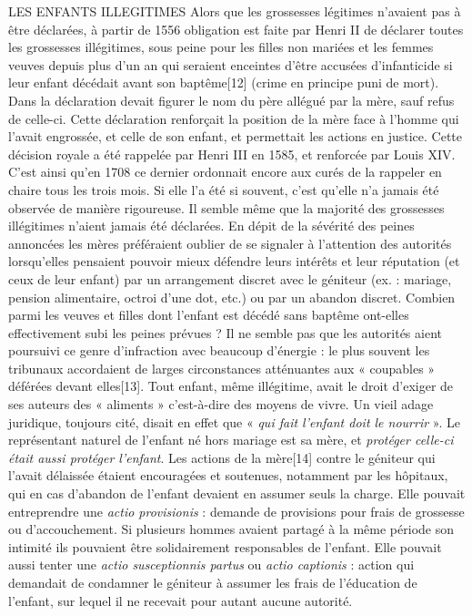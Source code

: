 LES ENFANTS ILLEGITIMES
 Alors que les grossesses légitimes n'avaient pas à être déclarées, à partir de 1556 obligation est faite par Henri II de déclarer toutes les grossesses illégitimes, sous peine pour les filles non mariées et les femmes veuves depuis plus d'un an qui seraient enceintes d'être accusées d'infanticide si leur enfant décédait avant son baptême[12] (crime en principe puni de mort). Dans la déclaration devait figurer le nom du père allégué par la mère, sauf refus de celle-ci. Cette déclaration renforçait la position de la mère face à l'homme qui l'avait engrossée, et celle de son enfant, et permettait les actions en justice. Cette décision royale a été rappelée par Henri III en 1585, et renforcée par Louis XIV. C'est ainsi qu'en 1708 ce dernier ordonnait encore aux curés de la rappeler en chaire tous les trois mois. 
 Si elle l'a été si souvent, c'est qu'elle n'a jamais été observée de manière rigoureuse. Il semble même que la majorité des grossesses illégitimes n'aient jamais été déclarées. En dépit de la sévérité des peines annoncées les mères préféraient oublier de se signaler à l'attention des autorités lorsqu'elles pensaient pouvoir mieux défendre leurs intérêts et leur réputation (et ceux de leur enfant) par un arrangement discret avec le géniteur (ex. : mariage, pension alimentaire, octroi d'une dot, etc.) ou par un abandon discret. Combien parmi les veuves et filles dont l'enfant est décédé sans baptême ont-elles effectivement subi les peines prévues ? Il ne semble pas que les autorités aient poursuivi ce genre d'infraction avec beaucoup d'énergie : le plus souvent les tribunaux accordaient de larges circonstances atténuantes aux « coupables » déférées devant elles[13]. 
 Tout enfant, même illégitime, avait le droit d'exiger de ses auteurs des « aliments » c'est-à-dire des moyens de vivre. Un vieil adage juridique, toujours cité, disait en effet que « \emph{qui fait l'enfant doit le nourrir} ». Le représentant naturel de l'enfant né hors mariage est sa mère, et \emph{protéger celle-ci était aussi protéger l'enfant}. Les actions de la mère[14] contre le géniteur qui l'avait délaissée étaient encouragées et soutenues, notamment par les hôpitaux, qui en cas d'abandon de l'enfant devaient en assumer seuls la charge. Elle pouvait entreprendre une \emph{actio provisionis} : demande de provisions pour frais de grossesse ou d'accouchement. Si plusieurs hommes avaient partagé à la même période son intimité ils pouvaient être solidairement responsables de l'enfant. Elle pouvait aussi tenter une \emph{actio susceptionnis partus} ou\emph{ actio captionis} : action qui demandait de condamner le géniteur à assumer les frais de l'éducation de l'enfant, sur lequel il ne recevait pour autant aucune autorité. 
